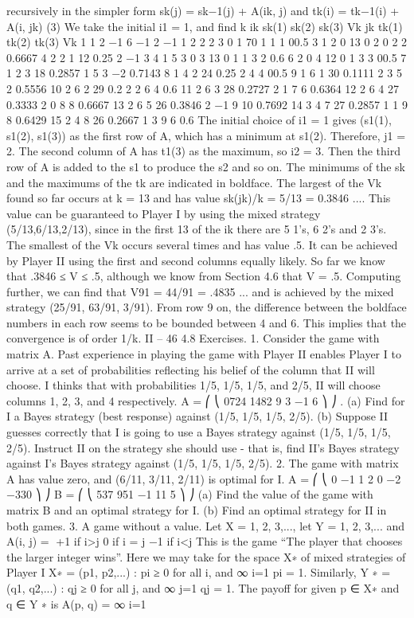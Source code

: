 recursively in the simpler form
sk(j) = sk−1(j) + A(ik, j) and tk(i) = tk−1(i) + A(i, jk) (3)
We take the initial i1 = 1, and find
k ik sk(1) sk(2) sk(3) Vk jk tk(1) tk(2) tk(3) Vk
1 1 2 −1 6 −1 2 −1 1 2 2
2 3 0 1 70 1 1 1 00.5
3 1 2 0 13 0 2 0 2 2 0.6667
4 2 2 1 12 0.25 2 −1 3 4 1
5 3 0 3 13 0 1 1 3 2 0.6
6 2 0 4 12 0 1 3 3 00.5
7 1 2 3 18 0.2857 1 5 3 −2 0.7143
8 1 4 2 24 0.25 2 4 4 00.5
9 1 6 1 30 0.1111 2 3 5 2 0.5556
10 2 6 2 29 0.2 2 2 6 4 0.6
11 2 6 3 28 0.2727 2 1 7 6 0.6364
12 2 6 4 27 0.3333 2 0 8 8 0.6667
13 2 6 5 26 0.3846 2 −1 9 10 0.7692
14 3 4 7 27 0.2857 1 1 9 8 0.6429
15 2 4 8 26 0.2667 1 3 9 6 0.6
The initial choice of i1 = 1 gives (s1(1), s1(2), s1(3)) as the first row of A, which has a
minimum at s1(2). Therefore, j1 = 2. The second column of A has t1(3) as the maximum,
so i2 = 3. Then the third row of A is added to the s1 to produce the s2 and so on. The
minimums of the sk and the maximums of the tk are indicated in boldface. The largest
of the Vk found so far occurs at k = 13 and has value sk(jk)/k = 5/13 = 0.3846 .... This
value can be guaranteed to Player I by using the mixed strategy (5/13,6/13,2/13), since in
the first 13 of the ik there are 5 1’s, 6 2’s and 2 3’s. The smallest of the Vk occurs several
times and has value .5. It can be achieved by Player II using the first and second columns
equally likely. So far we know that .3846 ≤ V ≤ .5, although we know from Section 4.6
that V = .5.
Computing further, we can find that V91 = 44/91 = .4835 ... and is achieved by
the mixed strategy (25/91, 63/91, 3/91). From row 9 on, the difference between the boldface
numbers in each row seems to be bounded between 4 and 6. This implies that the
convergence is of order 1/k.
II – 46
4.8 Exercises.
1. Consider the game with matrix A. Past experience in playing the game with Player
II enables Player I to arrive at a set of probabilities reflecting his belief of the column that II
will choose. I thinks that with probabilities 1/5, 1/5, 1/5, and 2/5, II will choose columns
1, 2, 3, and 4 respectively.
A =
⎛
⎝
0724
1482
9 3 −1 6
⎞
⎠ .
(a) Find for I a Bayes strategy (best response) against (1/5, 1/5, 1/5, 2/5).
(b) Suppose II guesses correctly that I is going to use a Bayes strategy against
(1/5, 1/5, 1/5, 2/5). Instruct II on the strategy she should use - that is, find II’s Bayes
strategy against I’s Bayes strategy against (1/5, 1/5, 1/5, 2/5).
2. The game with matrix A has value zero, and (6/11, 3/11, 2/11) is optimal for I.
A =
⎛
⎝
0 −1 1
2 0 −2
−330
⎞
⎠ B =
⎛
⎝
537
951
−1 11 5
⎞
⎠
(a) Find the value of the game with matrix B and an optimal strategy for I.
(b) Find an optimal strategy for II in both games.
3. A game without a value. Let X = {1, 2, 3,...}, let Y = {1, 2, 3,...} and
A(i, j) =  +1 if i>j
0 if i = j
−1 if i<j
This is the game “The player that chooses the larger integer wins”. Here we may take for
the space X∗ of mixed strategies of Player I
X∗ = {(p1, p2,...) : pi ≥ 0 for all i, and 
∞
i=1
pi = 1}.
Similarly,
Y ∗ = {(q1, q2,...) : qj ≥ 0 for all j, and 
∞
j=1
qj = 1}.
The payoff for given p ∈ X∗ and q ∈ Y ∗ is
A(p, q) = 
∞
i=1

